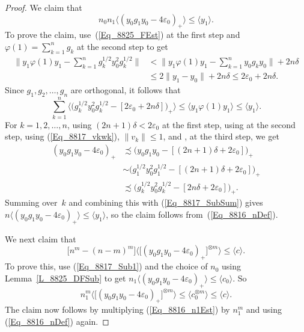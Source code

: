 \documentclass[11pt]{amsart}
\theoremstyle{plain}
\theoremstyle{definition}
\theoremstyle{remark}
\numberwithin{equation}{section}
\newcommand{\dt}{\delta}
\newcommand{\ep}{\varepsilon}
\newcommand{\ph}{\varphi}
\begin{document}
\begin{proof}
We claim that
%
\begin{equation}\label{Eq_8817_Sub1}
n_0 n_1 \langle ( y_0 g_1 y_0 - 4 \ep_0 )_{+} \rangle
 \leq \langle y_1 \rangle.
\end{equation}
%
To prove the claim,
use~(\ref{Eq_8825_FEst}) at the first step
and $\ph (1) = \sum_{k = 1}^n g_k$ at the second step to get
%
\begin{align*}
\biggl\| y_1 \ph (1) y_1
   - \sum_{k = 1}^n g_k^{1/2} y_0^2 g_k^{1/2} \biggr\|
& < \biggl\| y_1 \ph (1) y_1 - \sum_{k = 1}^n y_0 g_k y_0 \biggr\|
      + 2 n \dt
\\
& \leq 2 \| y_1 - y_0 \| + 2 n \dt
  \leq 2 \ep_0 + 2 n \dt.
\end{align*}
%
Since $g_1, g_2, \ldots, g_n$ are orthogonal,
it follows that
%
\begin{equation}\label{Eq_8817_SubSum}
\sum_{k = 1}^n \bigl\langle \bigl( g_k^{1/2} y_0^2 g_k^{1/2}
          - [2 \ep_0 + 2 n \dt] \bigr)_{+} \bigr\rangle
   \leq \langle y_1 \ph (1) y_1 \rangle
   \leq \langle y_1 \rangle.
\end{equation}
%
For $k = 1, 2, \ldots, n$,
using $(2 n + 1) \dt < 2 \ep_0$ at the first step,
using \cite[Lemma~1.4(6)]{Ph14} at the second step,
using (\ref{Eq_8817_vkwk}), $\| v_k \| \leq 1$,
and \cite[Lemma~2.3]{AGJP21}, at the third step,
we get
%
\begin{align*}
( y_0 g_1 y_0 - 4 \ep_0 )_{+}
& \precsim \bigl( y_0 g_1 y_0 - [(2 n + 1) \dt + 2 \ep_0] \bigr)_{+}
\\
& \sim \bigl( g_1^{1/2} y_0^2 g_1^{1/2}
     - [(2 n + 1) \dt + 2 \ep_0] \bigr)_{+}
\\
& \precsim \bigl( g_k^{1/2} y_0^2 g_k^{1/2}
     - [2 n \dt + 2 \ep_0] \bigr)_{+}.
\end{align*}
%
Summing over~$k$ and combining this with (\ref{Eq_8817_SubSum}) gives
$n \langle ( y_0 g_1 y_0 - 4 \ep_0 )_{+} \rangle
 \leq \langle y_1 \rangle$,
so the claim follows from~(\ref{Eq_8816_nDef}).

We next claim that
%
\begin{equation}\label{Eq_8817_cBound}
\bigl[ n^m - (n - m)^m \bigr]
 \bigl\langle \bigl[
     ( y_0 g_1 y_0 - 4 \ep_0 )_{+} \bigr]^{\otimes m} \bigr\rangle
 \leq \langle c \rangle.
\end{equation}
%
To prove this,
use (\ref{Eq_8817_Sub1})
and the choice of $n_0$ using Lemma~\ref{L_8825_DFSub}
to get
$n_1 \langle ( y_0 g_1 y_0 - 4 \ep_0 )_{+} \rangle
 \leq \langle c_0 \rangle$.
So
\[
n_1^m \bigl\langle \bigl[
     ( y_0 g_1 y_0 - 4 \ep_0 )_{+} \bigr]^{\otimes m} \bigr\rangle
 \leq \langle c_0^{\otimes m} \rangle
 \leq \langle c \rangle.
\]
The claim now follows by multiplying (\ref{Eq_8816_n1Est})
by $n_1^m$ and using (\ref{Eq_8816_nDef}) again.


\end{proof}
\end{document}
